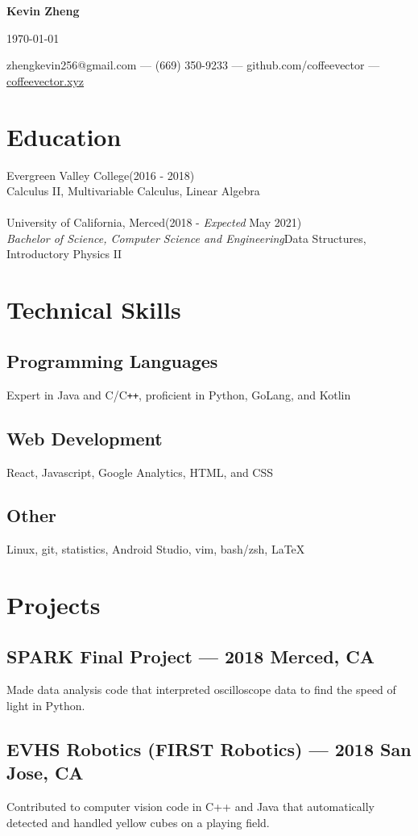 \documentclass[letterpaper,12pt]{article}
\makeatletter
\newcommand\textbox[1]{%
	\parbox{.333\textwidth}{#1}%
}
\renewcommand{\maketitle}{
	\begin{center}
		\noindent\textbox{\hfill}\textbox{\hfil\bfseries\huge Kevin Zheng\hfil}\textbox{\hfill \today}
		{zhengkevin256@gmail.com --- (669) 350-9233 --- github.com/coffeevector --- \underline{\color{blue}coffeevector.xyz}}
	\end{center} }
\makeatother
\begin{document}
\maketitle
\section{Education}
Evergreen Valley College\null\hfill (2016 - 2018)\\
\null\hfill Calculus II, Multivariable Calculus, Linear Algebra\\~\\
University of California, Merced\null\hfill(2018 - \emph{Expected} May 2021)\\
\emph{Bachelor of Science, Computer Science and Engineering}\null\hfill Data Structures, Introductory Physics II
\section{Technical Skills}
	\subsection{Programming Languages}
	Expert in Java and C/C\verb!++!, proficient in Python, GoLang, and Kotlin
	\vspace*{-2mm}
	\subsection{Web Development}
	React, Javascript, Google Analytics, HTML, and CSS
	\vspace*{-2mm}
	\subsection{Other}
	Linux, git, statistics, Android Studio, vim, bash/zsh, {\LaTeX}
\section{Projects}
	\subsection{SPARK Final Project --- 2018 \null\hfill Merced, CA}
	\par Made data analysis code that interpreted oscilloscope data to find the speed of light in Python.
	\vspace*{-2mm}
	\subsection{EVHS Robotics (FIRST Robotics) --- 2018 \null\hfill San Jose, CA}
	\par Contributed to computer vision code in C++ and Java that automatically detected and handled yellow cubes on a playing field.
	\vspace*{-2mm}
\end{document}
